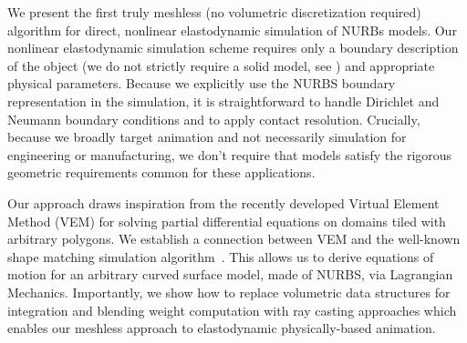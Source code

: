 We present the first truly meshless (no volumetric discretization required) algorithm for direct, nonlinear elastodynamic simulation of NURBs models. 
Our nonlinear elastodynamic simulation scheme requires only a boundary description of the object (we do not strictly require a solid model, see ) and
appropriate physical parameters.  
Because we explicitly use the NURBS boundary representation in the simulation, it is straightforward to handle
Dirichlet and Neumann boundary conditions and to apply contact resolution. 
Crucially, because we broadly target animation and not necessarily simulation for engineering or manufacturing, we don't require that models
satisfy the rigorous geometric requirements common for these applications.

Our approach draws inspiration from the recently developed Virtual Element Method (VEM) for solving partial differential equations on domains tiled with arbitrary polygons.
We establish a connection between VEM and the well-known shape matching simulation algorithm~\cite{10.1145/1073204.1073216,10.1145/2019406.2019438}. This allows us 
to derive equations of motion for an arbitrary curved surface model, made of NURBS, via Lagrangian Mechanics. 
Importantly, we show how to replace volumetric data structures for integration and blending weight computation with ray casting approaches which enables
our meshless approach to elastodynamic physically-based animation.

